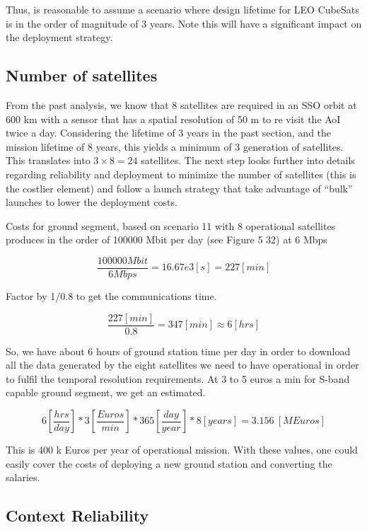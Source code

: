 Thus, is reasonable to assume a scenario where design lifetime for LEO CubeSats is in the order of magnitude of 3 years. Note this will have a significant impact on the deployment strategy.

\subsection{Number of satellites}

From the past analysis, we know that 8 satellites are required in an SSO orbit at 600 km with a sensor that has a spatial resolution of 50 m to re visit the AoI twice a day. Considering the lifetime of 3 years in the past section, and the mission lifetime of 8 years, this yields a minimum of 3 generation of satellites. This translates into \(3\times8=24\) satellites. The next step looks further into details regarding reliability and deployment to minimize the number of satellites (this is the costlier element) and follow a launch strategy that take advantage of “bulk” launches to lower the deployment costs.

Costs for ground segment, based on scenario 11 with 8 operational satellites produces in the order of 100000 Mbit per day (see Figure 5 32) at 6 Mbps 

\[\frac{100000Mbit}{6Mbps}=16.67e3\left[s\right]=227[min]\]

Factor by 1/0.8 to get the communications time.

\[\frac{227\left[min\right]}{0.8}=347\left[min\right]\approx6[hrs]\]

So, we have about 6 hours of ground station time per day in order to download all the data generated by the eight satellites we need to have operational in order to fulfil the temporal resolution requirements. At 3 to 5 euros a min for S-band capable ground segment, we get an estimated.

\[6\left[\frac{hrs}{day}\right]\ast3\left[\frac{Euros}{min}\right]\ast365\left[\frac{day}{year}\right]\ast8\left[years\right]=3.156\ [MEuros]\]

This is 400 k Euros per year of operational mission. With these values, one could easily cover the costs of deploying a new ground station and converting the salaries.


\subsection{Context Reliability}


